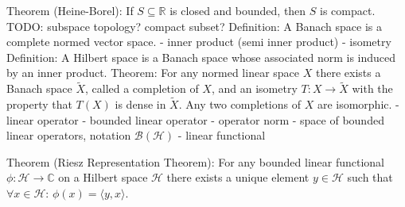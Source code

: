 \documentclass[12pt,oneside]{report}
\begin{document}
 Theorem (Heine-Borel): If $S \subseteq \mathbb{R}$ is closed and bounded, then $S$ is compact. TODO: subspace topology? compact subset?
 Definition: A Banach space is a complete normed vector space.
- inner product (semi inner product)
- isometry
 Definition: A Hilbert space is a Banach space whose associated norm is induced by an inner product.
 Theorem: For any normed linear space $X$ there exists a Banach space $\tilde{X}$, called a completion of $X$, and an isometry $T: X \to \tilde{X}$ with the property that $T(X)$ is dense in $\tilde{X}$. Any two completions of $X$ are isomorphic.
- linear operator
- bounded linear operator
- operator norm
- space of bounded linear operators, notation $\mathscr{B}(\mathscr{H})$
- linear functional

 Theorem (Riesz Representation Theorem): For any bounded linear functional $\phi: \mathscr{H} \to \mathbb{C}$ on a Hilbert space $\mathscr{H}$ there exists a unique element $y \in \mathscr{H}$ such that $\forall x \in \mathscr{H}: \,\phi(x) = \langle y, x \rangle$.
\end{document}
